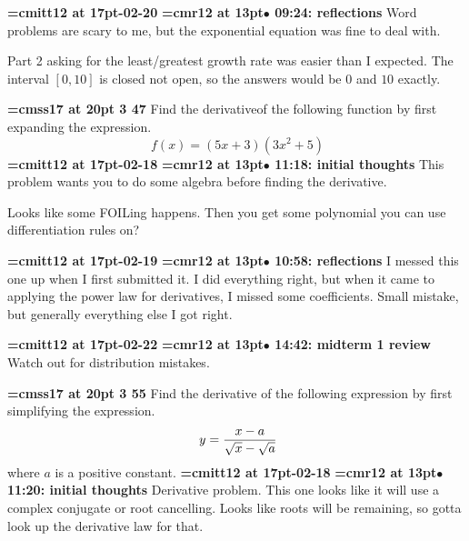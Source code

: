 {\medskip\noindent\bf\font\titlefont=cmitt12 at 17pt-02-20}\medskip
{\smallskip\noindent\bf\font\titlefont=cmr12 at 13pt\titlefont $\bullet$ 09:24: reflections}\smallskip
Word problems are scary to me, but the exponential equation was fine to deal with.
\par

Part 2 asking for the least/greatest growth rate was easier than I expected. The interval $[0, 10]$ is closed not open, so the answers would be $0$ and $10$ exactly.
\par

{\medskip\noindent\bf\font\titlefont=cmss17 at 20pt 3 47}\medskip
Find the derivativeof the following function by first expanding
the expression.
$$\
f(x) = (5x + 3)(3x^2 + 5)
$$
{\medskip\noindent\bf\font\titlefont=cmitt12 at 17pt-02-18}\medskip
{\smallskip\noindent\bf\font\titlefont=cmr12 at 13pt\titlefont $\bullet$ 11:18: initial thoughts}\smallskip
This problem wants you to do some algebra before finding the derivative.
\par

Looks like some FOILing happens. Then you get some polynomial you can use differentiation rules on?
\par

{\medskip\noindent\bf\font\titlefont=cmitt12 at 17pt-02-19}\medskip
{\smallskip\noindent\bf\font\titlefont=cmr12 at 13pt\titlefont $\bullet$ 10:58: reflections}\smallskip
I messed this one up when I first submitted it. I did everything right, but when it came to applying the power law for derivatives, I missed some coefficients. Small mistake, but generally everything else I got right.
\par

{\medskip\noindent\bf\font\titlefont=cmitt12 at 17pt-02-22}\medskip
{\smallskip\noindent\bf\font\titlefont=cmr12 at 13pt\titlefont $\bullet$ 14:42: midterm 1 review}\smallskip
Watch out for distribution mistakes.
\par

{\medskip\noindent\bf\font\titlefont=cmss17 at 20pt 3 55}\medskip
Find the derivative of the following expression by first
simplifying the expression.
$$\
y = {x - a \over \sqrt{x} - \sqrt{a}}
$$
where $a$ is a positive constant.
{\medskip\noindent\bf\font\titlefont=cmitt12 at 17pt-02-18}\medskip
{\smallskip\noindent\bf\font\titlefont=cmr12 at 13pt\titlefont $\bullet$ 11:20: initial thoughts}\smallskip
Derivative problem. This one looks like it will use a complex conjugate or root cancelling. Looks like roots will be remaining, so gotta look up the derivative law for that.
\par

